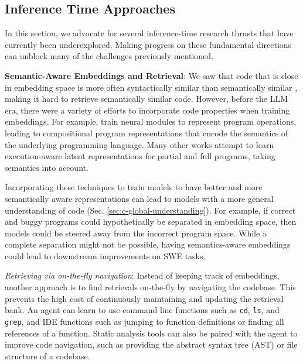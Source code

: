 \subsection{Inference Time Approaches}

In this section, we advocate for several inference-time research thrusts that have currently been underexplored. Making progress on these fundamental directions can unblock many of the challenges previously mentioned.

\textbf{Semantic-Aware Embeddings and Retrieval}: We saw that code that is close in embedding space is more often syntactically similar than semantically similar \citep{zhao2023get}, making it hard to retrieve semantically similar code. However, before the LLM era, there were a variety of efforts to incorporate code properties when training embeddings. For example, \citet{nye2020representing} train neural modules to represent program operations, leading to compositional program representations that encode the semantics of the underlying programming language. Many other works \citep{zohar2018automatic, ellis2019write, chen2021latent} attempt to learn execution-aware latent representations for partial and full programs, taking semantics into account. 

Incorporating these techniques to train models to have better and more semantically aware representations can lead to models with a more general understanding of code (Sec. \ref{sec:c-global-understanding}). For example, if correct and buggy programs could hypothetically be separated in embedding space, then models could be steered away from the incorrect program space. While a complete separation might not be possible, having semantics-aware embeddings could lead to downstream improvements on SWE tasks.

\textit{Retrieving via on-the-fly navigation}: Instead of keeping track of embeddings, another approach is to find retrievals on-the-fly by navigating the codebase. This prevents the high cost of continuously maintaining and updating the retrieval bank. An agent can learn to use command line functions such as \texttt{cd}, \texttt{ls}, and \texttt{grep}, and IDE functions such as jumping to function definitions or finding all references of a function. Static analysis tools can also be paired with the agent to improve code navigation, such as providing the abstract syntax tree (AST) or file structure of a codebase.

